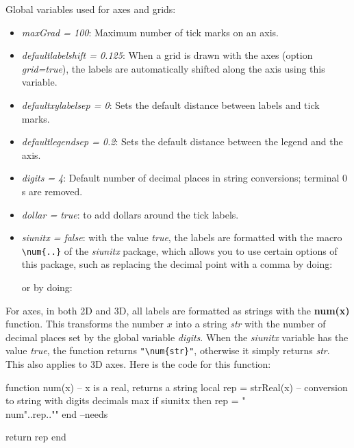 Global variables used for axes and grids:
\begin{itemize}
    \item \emph{maxGrad = 100}: Maximum number of tick marks on an axis.
    \item \emph{defaultlabelshift = 0.125}: When a grid is drawn with the axes (option \emph{grid=true}), the labels are automatically shifted along the axis using this variable.
    \item \emph{defaultxylabelsep = 0}: Sets the default distance between labels and tick marks.
    \item \emph{defaultlegendsep = 0.2}: Sets the default distance between the legend and the axis.
    \item \emph{digits = 4}: Default number of decimal places in string conversions; terminal $0$s are removed.     \item \emph{dollar = true}: to add dollars around the tick labels.
    \item \emph{siunitx = false}: with the value \emph{true}, the labels are formatted with the macro \verb|\num{..}| of the \emph{siunitx} package, which allows you to use certain options of this package, such as replacing the decimal point with a comma by doing: \par
\begin{TeXcode}
\usepackage[local=FR]{siunitx}
\end{TeXcode}
or by doing:
\begin{TeXcode}
\usepackage{siunitx}
\end{TeXcode}
\end{itemize}
For axes, in both 2D and 3D, all labels are formatted as strings with the \textbf{num(x)} function. This transforms the number $x$ into a string \emph{str} with the number of decimal places set by the global variable \emph{digits}. When the \emph{siunitx} variable has the value \emph{true}, the function returns \verb|"\num{str}"|, otherwise it simply returns \emph{str}. This also applies to 3D axes. Here is the code for this function:
\begin{Luacode}
function num(x) -- x is a real, returns a string
local rep = strReal(x) -- conversion to string with digits decimals max
if siunitx then rep = "\\num{"..rep.."}" end --needs \usepackage{siunitx}
return rep
end
\end{Luacode}


